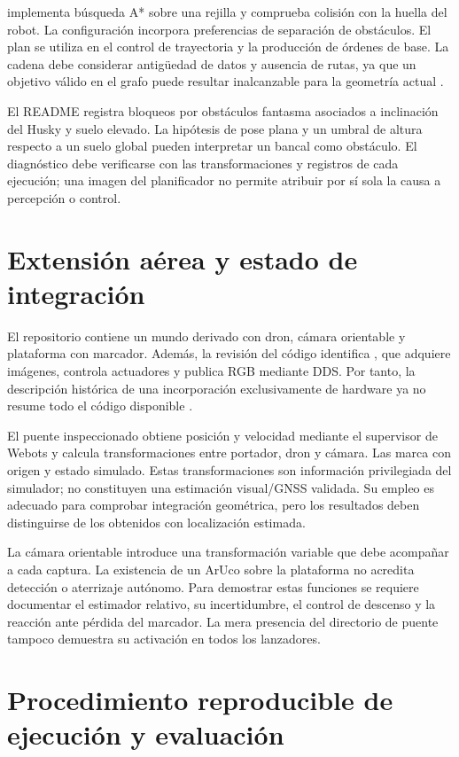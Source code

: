  implementa búsqueda A* sobre una rejilla y comprueba colisión con la huella del robot. La configuración incorpora preferencias de separación de obstáculos. El plan se utiliza en el control de trayectoria y la producción de órdenes de base. La cadena debe considerar antigüedad de datos y ausencia de rutas, ya que un objetivo válido en el grafo puede resultar inalcanzable para la geometría actual \cite{nav}.

El README registra bloqueos por obstáculos fantasma asociados a inclinación del Husky y suelo elevado. La hipótesis de pose plana y un umbral de altura respecto a un suelo global pueden interpretar un bancal como obstáculo. El diagnóstico debe verificarse con las transformaciones y registros de cada ejecución; una imagen del planificador no permite atribuir por sí sola la causa a percepción o control.

\section{Extensión aérea y estado de integración}
El repositorio contiene un mundo derivado con dron, cámara orientable y plataforma con marcador. Además, la revisión del código identifica , que adquiere imágenes, controla actuadores y publica RGB mediante DDS. Por tanto, la descripción histórica de una incorporación exclusivamente de hardware ya no resume todo el código disponible \cite{drone}.

El puente inspeccionado obtiene posición y velocidad mediante el supervisor de Webots y calcula transformaciones entre portador, dron y cámara. Las marca con origen  y estado simulado. Estas transformaciones son información privilegiada del simulador; no constituyen una estimación visual/GNSS validada. Su empleo es adecuado para comprobar integración geométrica, pero los resultados deben distinguirse de los obtenidos con localización estimada.

La cámara orientable introduce una transformación variable que debe acompañar a cada captura. La existencia de un ArUco sobre la plataforma no acredita detección o aterrizaje autónomo. Para demostrar estas funciones se requiere documentar el estimador relativo, su incertidumbre, el control de descenso y la reacción ante pérdida del marcador. La mera presencia del directorio de puente tampoco demuestra su activación en todos los lanzadores.

\section{Procedimiento reproducible de ejecución y evaluación}
